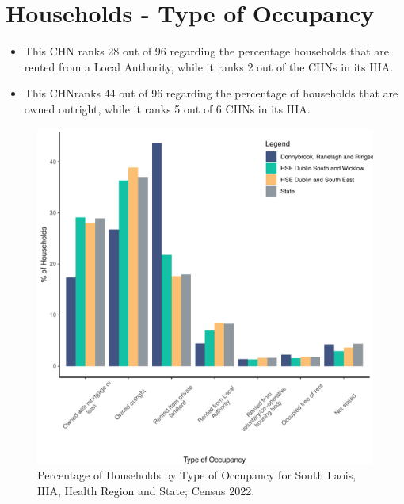 \documentclass{article}
\begin{document}
\section{Households - Type of Occupancy}\label{sect:Households}
\begin{itemize}
\item This CHN ranks  28 out of 96 regarding the percentage households that are rented from a Local Authority, while it ranks  2 out of the CHNs in its IHA. 
\item This CHNranks  44 out of 96 regarding the percentage of households that are owned outright, while it ranks   5 out of 6 CHNs in its IHA.
\end{itemize}
\begin{figure}[H]
	\centering
	\includegraphics[width = 140mm]{../figures/HouseholdsED.pdf}
	\caption{Percentage of Households by Type of Occupancy for South Laois, IHA, Health Region and State; Census 2022.}
	\label{fig:vbnv}
	\end{figure}
\end{document}
